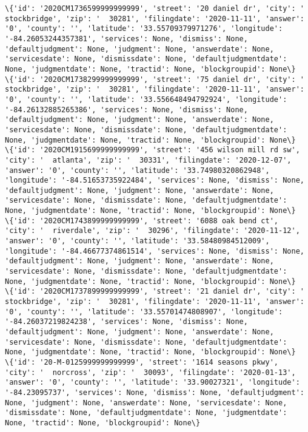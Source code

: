 \documentclass[11pt]{article}
\begin{document}
\begin{Verbatim}[commandchars=\\\{\}]
\{'id': '2020CM1736599999999999', 'street': '20 daniel dr', 'city': '  stockbridge', 'zip': '  30281', 'filingdate': '2020-11-11', 'answer': '0', 'county': '', 'latitude': '33.55709379971276', 'longitude': '-84.26053244357381', 'services': None, 'dismiss': None, 'defaultjudgment': None, 'judgment': None, 'answerdate': None, 'servicesdate': None, 'dismissdate': None, 'defaultjudgmentdate': None, 'judgmentdate': None, 'tractid': None, 'blockgroupid': None\}
\{'id': '2020CM1738299999999999', 'street': '75 daniel dr', 'city': '  stockbridge', 'zip': '  30281', 'filingdate': '2020-11-11', 'answer': '0', 'county': '', 'latitude': '33.556648494792924', 'longitude': '-84.26132885265386', 'services': None, 'dismiss': None, 'defaultjudgment': None, 'judgment': None, 'answerdate': None, 'servicesdate': None, 'dismissdate': None, 'defaultjudgmentdate': None, 'judgmentdate': None, 'tractid': None, 'blockgroupid': None\}
\{'id': '2020CM1915699999999999', 'street': '456 wilson mill rd sw', 'city': '  atlanta', 'zip': '  30331', 'filingdate': '2020-12-07', 'answer': '0', 'county': '', 'latitude': '33.74980320862948', 'longitude': '-84.51653735922484', 'services': None, 'dismiss': None, 'defaultjudgment': None, 'judgment': None, 'answerdate': None, 'servicesdate': None, 'dismissdate': None, 'defaultjudgmentdate': None, 'judgmentdate': None, 'tractid': None, 'blockgroupid': None\}
\{'id': '2020CM1743899999999999', 'street': '6088 oak bend ct', 'city': '  riverdale', 'zip': '  30296', 'filingdate': '2020-11-12', 'answer': '0', 'county': '', 'latitude': '33.58480984512009', 'longitude': '-84.46677374861514', 'services': None, 'dismiss': None, 'defaultjudgment': None, 'judgment': None, 'answerdate': None, 'servicesdate': None, 'dismissdate': None, 'defaultjudgmentdate': None, 'judgmentdate': None, 'tractid': None, 'blockgroupid': None\}
\{'id': '2020CM1737899999999999', 'street': '21 daniel dr', 'city': '  stockbridge', 'zip': '  30281', 'filingdate': '2020-11-11', 'answer': '0', 'county': '', 'latitude': '33.55701474808907', 'longitude': '-84.26037219824238', 'services': None, 'dismiss': None, 'defaultjudgment': None, 'judgment': None, 'answerdate': None, 'servicesdate': None, 'dismissdate': None, 'defaultjudgmentdate': None, 'judgmentdate': None, 'tractid': None, 'blockgroupid': None\}
\{'id': '20-M-0125999999999999', 'street': '1614 seasons pkwy', 'city': '  norcross', 'zip': '  30093', 'filingdate': '2020-01-13', 'answer': '0', 'county': '', 'latitude': '33.90027321', 'longitude': '-84.23095737', 'services': None, 'dismiss': None, 'defaultjudgment': None, 'judgment': None, 'answerdate': None, 'servicesdate': None, 'dismissdate': None, 'defaultjudgmentdate': None, 'judgmentdate': None, 'tractid': None, 'blockgroupid': None\}

\end{Verbatim}
\end{document}
